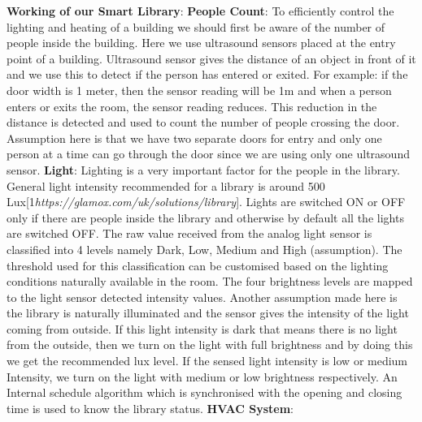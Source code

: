 \documentclass[runningheads]{llncs}
\begin{document}
\vspace{3mm}
\textbf{Working of our Smart Library}:
\vspace{5mm}
\newline\textbf{People Count}:
To efficiently control the lighting and heating of a building we should first be aware of the number of people inside the building. Here we use ultrasound sensors placed at the entry point of a building. Ultrasound sensor gives the distance of an object in front of it and we use this to detect if the person has entered or exited. For example: if the door width is 1 meter, then the sensor reading will be 1m and when a person enters or exits the room, the sensor reading reduces. This reduction in the distance is detected and used to count the number of people crossing the door. Assumption here is that we have two separate doors for entry and only one person at a time can go through the door since we are using only one ultrasound sensor.
\vspace{2mm}
\newline\textbf{Light}:
Lighting is a very important factor for the people in the library. General light intensity recommended for a library is around 500 Lux[1\textit{https://glamox.com/uk/solutions/library}]. Lights are switched ON or OFF only if there are people inside the library and otherwise by default all the lights are switched OFF. The raw value received from the analog light sensor is classified into 4 levels namely Dark, Low, Medium and High (assumption). The threshold used for this classification can be customised based on the lighting conditions naturally available in the room. The four brightness levels are mapped to the light sensor detected intensity values. Another assumption made here is the library is naturally illuminated and the sensor gives the intensity of the light coming from outside. If this light intensity is dark that means there is no light from the outside, then we turn on the light with full brightness and by doing this we get the recommended lux level. If the sensed light intensity is low or medium Intensity, we turn on the light with medium or low brightness respectively. An Internal schedule algorithm which is synchronised with the opening and closing time is used to know the library status.
\vspace{3mm}
\newline
\textbf{HVAC System}:
\end{document}
